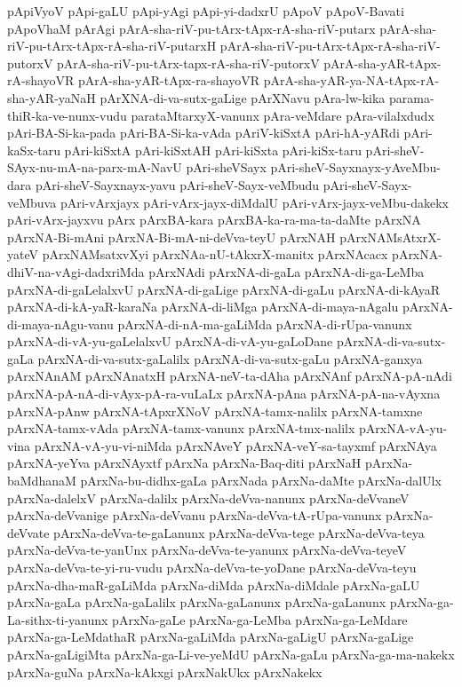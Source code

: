 {pApiVyoV
pApi-gaLU
pApi-yAgi
pApi-yi-dadxrU
pApoV
pApoV-Bavati
pApoVhaM
pArAgi
pArA-sha-riV-pu-tArx-tApx-rA-sha-riV-putarx
pArA-sha-riV-pu-tArx-tApx-rA-sha-riV-putarxH
pArA-sha-riV-pu-tArx-tApx-rA-sha-riV-putorxV
pArA-sha-riV-pu-tArx-tapx-rA-sha-riV-putorxV
pArA-sha-yAR-tApx-rA-shayoVR
pArA-sha-yAR-tApx-ra-shayoVR
pArA-sha-yAR-ya-NA-tApx-rA-sha-yAR-yaNaH
pArXNA-di-va-sutx-gaLige
pArXNavu
pAra-lw-kika
parama-thiR-ka-ve-nunx-vudu
parataMtarxyX-vanunx
pAra-veMdare
pAra-vilalxdudx
pAri-BA-Si-ka-pada
pAri-BA-Si-ka-vAda
pAriV-kiSxtA
pAri-hA-yARdi
pAri-kaSx-taru
pAri-kiSxtA
pAri-kiSxtAH
pAri-kiSxta
pAri-kiSx-taru
pAri-sheV-SAyx-nu-mA-na-parx-mA-NavU
pAri-sheVSayx
pAri-sheV-Sayxnayx-yAveMbu-dara
pAri-sheV-Sayxnayx-yavu
pAri-sheV-Sayx-veMbudu
pAri-sheV-Sayx-veMbuva
pAri-vArxjayx
pAri-vArx-jayx-diMdalU
pAri-vArx-jayx-veMbu-dakekx
pAri-vArx-jayxvu
pArx
pArxBA-kara
pArxBA-ka-ra-ma-ta-daMte
pArxNA
pArxNA-Bi-mAni
pArxNA-Bi-mA-ni-deVva-teyU
pArxNAH
pArxNAMsAtxrX-yateV
pArxNAMsatxvXyi
pArxNAa-nU-tAkxrX-manitx
pArxNAcacx
pArxNA-dhiV-na-vAgi-dadxriMda
pArxNAdi
pArxNA-di-gaLa
pArxNA-di-ga-LeMba
pArxNA-di-gaLelalxvU
pArxNA-di-gaLige
pArxNA-di-gaLu
pArxNA-di-kAyaR
pArxNA-di-kA-yaR-karaNa
pArxNA-di-liMga
pArxNA-di-maya-nAgalu
pArxNA-di-maya-nAgu-vanu
pArxNA-di-nA-ma-gaLiMda
pArxNA-di-rUpa-vanunx
pArxNA-di-vA-yu-gaLelalxvU
pArxNA-di-vA-yu-gaLoDane
pArxNA-di-va-sutx-gaLa
pArxNA-di-va-sutx-gaLalilx
pArxNA-di-va-sutx-gaLu
pArxNA-ganxya
pArxNAnAM
pArxNAnatxH
pArxNA-neV-ta-dAha
pArxNAnf
pArxNA-pA-nAdi
pArxNA-pA-nA-di-vAyx-pA-ra-vuLaLx
pArxNA-pAna
pArxNA-pA-na-vAyxna
pArxNA-pAnw
pArxNA-tApxrXNoV
pArxNA-tamx-nalilx
pArxNA-tamxne
pArxNA-tamx-vAda
pArxNA-tamx-vanunx
pArxNA-tmx-nalilx
pArxNA-vA-yu-vina
pArxNA-vA-yu-vi-niMda
pArxNAveY
pArxNA-veY-sa-tayxmf
pArxNAya
pArxNA-yeYva
pArxNAyxtf
pArxNa
pArxNa-Baq-diti
pArxNaH
pArxNa-baMdhanaM
pArxNa-bu-didhx-gaLa
pArxNada
pArxNa-daMte
pArxNa-dalUlx
pArxNa-dalelxV
pArxNa-dalilx
pArxNa-deVva-nanunx
pArxNa-deVvaneV
pArxNa-deVvanige
pArxNa-deVvanu
pArxNa-deVva-tA-rUpa-vanunx
pArxNa-deVvate
pArxNa-deVva-te-gaLanunx
pArxNa-deVva-tege
pArxNa-deVva-teya
pArxNa-deVva-te-yanUnx
pArxNa-deVva-te-yanunx
pArxNa-deVva-teyeV
pArxNa-deVva-te-yi-ru-vudu
pArxNa-deVva-te-yoDane
pArxNa-deVva-teyu
pArxNa-dha-maR-gaLiMda
pArxNa-diMda
pArxNa-diMdale
pArxNa-gaLU
pArxNa-gaLa
pArxNa-gaLalilx
pArxNa-gaLanunx
pArxNa-gaLanunx
pArxNa-ga-La-sithx-ti-yanunx
pArxNa-gaLe
pArxNa-ga-LeMba
pArxNa-ga-LeMdare
pArxNa-ga-LeMdathaR
pArxNa-gaLiMda
pArxNa-gaLigU
pArxNa-gaLige
pArxNa-gaLigiMta
pArxNa-ga-Li-ve-yeMdU
pArxNa-gaLu
pArxNa-ga-ma-nakekx
pArxNa-guNa
pArxNa-kAkxgi
pArxNakUkx
pArxNakekx
}
